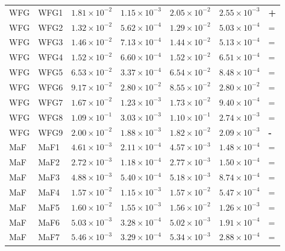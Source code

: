 \begin{table}[t]
\begin{tabular}{llrrrrl}
\addlinespace
WFG & WFG1 & $1.81\!\times\!10^{-2}$ & $1.15\!\times\!10^{-3}$ & $2.05\!\times\!10^{-2}$ & $2.55\!\times\!10^{-3}$ & \textbf{+} \\
WFG & WFG2 & $1.32\!\times\!10^{-2}$ & $5.62\!\times\!10^{-4}$ & $1.29\!\times\!10^{-2}$ & $5.03\!\times\!10^{-4}$ & = \\
WFG & WFG3 & $1.46\!\times\!10^{-2}$ & $7.13\!\times\!10^{-4}$ & $1.44\!\times\!10^{-2}$ & $5.13\!\times\!10^{-4}$ & = \\
WFG & WFG4 & $1.52\!\times\!10^{-2}$ & $6.60\!\times\!10^{-4}$ & $1.52\!\times\!10^{-2}$ & $6.51\!\times\!10^{-4}$ & = \\
WFG & WFG5 & $6.53\!\times\!10^{-2}$ & $3.37\!\times\!10^{-4}$ & $6.54\!\times\!10^{-2}$ & $8.48\!\times\!10^{-4}$ & = \\
WFG & WFG6 & $9.17\!\times\!10^{-2}$ & $2.80\!\times\!10^{-2}$ & $8.55\!\times\!10^{-2}$ & $2.80\!\times\!10^{-2}$ & = \\
WFG & WFG7 & $1.67\!\times\!10^{-2}$ & $1.23\!\times\!10^{-3}$ & $1.73\!\times\!10^{-2}$ & $9.40\!\times\!10^{-4}$ & = \\
WFG & WFG8 & $1.09\!\times\!10^{-1}$ & $3.03\!\times\!10^{-3}$ & $1.10\!\times\!10^{-1}$ & $2.74\!\times\!10^{-3}$ & = \\
WFG & WFG9 & $2.00\!\times\!10^{-2}$ & $1.88\!\times\!10^{-3}$ & $1.82\!\times\!10^{-2}$ & $2.09\!\times\!10^{-3}$ & \textbf{-} \\
\addlinespace
MaF & MaF1 & $4.61\!\times\!10^{-3}$ & $2.11\!\times\!10^{-4}$ & $4.57\!\times\!10^{-3}$ & $1.48\!\times\!10^{-4}$ & = \\
MaF & MaF2 & $2.72\!\times\!10^{-3}$ & $1.18\!\times\!10^{-4}$ & $2.77\!\times\!10^{-3}$ & $1.50\!\times\!10^{-4}$ & = \\
MaF & MaF3 & $4.88\!\times\!10^{-3}$ & $5.40\!\times\!10^{-4}$ & $5.18\!\times\!10^{-3}$ & $8.74\!\times\!10^{-4}$ & = \\
MaF & MaF4 & $1.57\!\times\!10^{-2}$ & $1.15\!\times\!10^{-3}$ & $1.57\!\times\!10^{-2}$ & $5.47\!\times\!10^{-4}$ & = \\
MaF & MaF5 & $1.60\!\times\!10^{-2}$ & $1.55\!\times\!10^{-3}$ & $1.56\!\times\!10^{-2}$ & $1.26\!\times\!10^{-3}$ & = \\
MaF & MaF6 & $5.03\!\times\!10^{-3}$ & $3.28\!\times\!10^{-4}$ & $5.02\!\times\!10^{-3}$ & $1.91\!\times\!10^{-4}$ & = \\
MaF & MaF7 & $5.46\!\times\!10^{-3}$ & $3.29\!\times\!10^{-4}$ & $5.34\!\times\!10^{-3}$ & $2.88\!\times\!10^{-4}$ & = \\
\bottomrule
\end{tabular}
\end{table}
